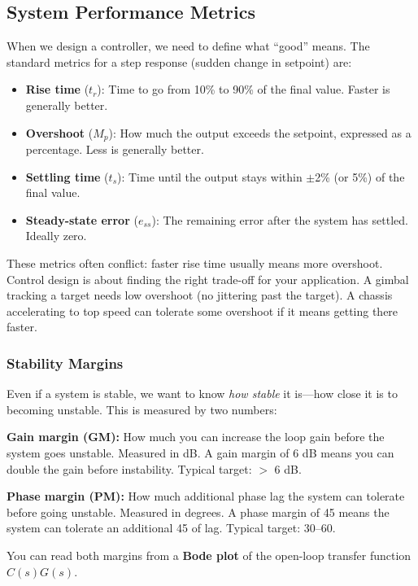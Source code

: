 \subsection{System Performance Metrics}

When we design a controller, we need to define what ``good'' means. The standard metrics for a step response (sudden change in setpoint) are:

\begin{itemize}
    \item \textbf{Rise time} ($t_r$): Time to go from 10\% to 90\% of the final value. Faster is generally better.
    \item \textbf{Overshoot} ($M_p$): How much the output exceeds the setpoint, expressed as a percentage. Less is generally better.
    \item \textbf{Settling time} ($t_s$): Time until the output stays within $\pm$2\% (or 5\%) of the final value.
    \item \textbf{Steady-state error} ($e_{ss}$): The remaining error after the system has settled. Ideally zero.
\end{itemize}

These metrics often conflict: faster rise time usually means more overshoot. Control design is about finding the right trade-off for your application. A gimbal tracking a target needs low overshoot (no jittering past the target). A chassis accelerating to top speed can tolerate some overshoot if it means getting there faster.

\subsubsection{Stability Margins}

Even if a system is stable, we want to know \textit{how stable} it is---how close it is to becoming unstable. This is measured by two numbers:

\textbf{Gain margin (GM):} How much you can increase the loop gain before the system goes unstable. Measured in dB. A gain margin of 6 dB means you can double the gain before instability. Typical target: $>$ 6 dB.

\textbf{Phase margin (PM):} How much additional phase lag the system can tolerate before going unstable. Measured in degrees. A phase margin of 45\textdegree{} means the system can tolerate an additional 45\textdegree{} of lag. Typical target: 30\textdegree--60\textdegree.

You can read both margins from a \textbf{Bode plot} of the open-loop transfer function $C(s)G(s)$.


